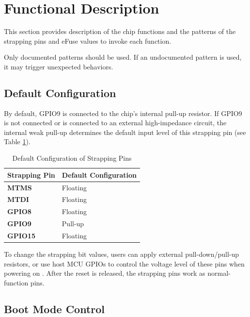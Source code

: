 \documentclass[main\_\_EN.tex]{subfiles}
\begin{document}
\section{Functional Description}

This section provides description of the chip functions and the patterns of the strapping pins and eFuse values to invoke each function.

\begin{importantlisting}

Only documented patterns should be used. If an undocumented pattern is used, it may trigger unexpected behaviors.
\end{importantlisting}

\subsection{Default Configuration}
By default, GPIO9 is connected to the chip's internal pull-up resistor. If GPIO9 is not connected or is connected to an external high-impedance circuit, the internal weak pull-up determines the default input level of this strapping pin (see Table \ref{tab:bootctrl-default-config-strapping-pins}).

\clearpage
\begin{longtable}[c]{|p{2.5cm}|p{3.5cm}|}
\caption{Default Configuration of Strapping Pins}
\label{tab:bootctrl-default-config-strapping-pins} \\
    \hline
    \rowcolor{lightgray}
  \textbf{Strapping Pin} & \textbf{Default Configuration} \\ \hline
  \textbf{MTMS} & Floating \\ \hline
  \textbf{MTDI} & Floating \\ \hline
  \textbf{GPIO8} & Floating \\ \hline
  \textbf{GPIO9} & Pull-up \\ \hline
  \textbf{GPIO15} & Floating \\ \hline
\end{longtable}
To change the strapping bit values, users can apply external pull-down/pull-up resistors, or use host MCU GPIOs to control the voltage level of these pins when powering on \chipname{}. After the reset is released, the strapping pins work as normal-function pins.

\subsection{Boot Mode Control}\label{sec:bootModeControl}
\end{document}
